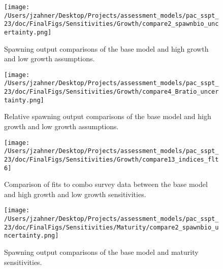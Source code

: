 \documentclass[11pt,
  letterpaper,
]{article}
\begin{document}
\begin{figure}
{\centering
\texttt{[image: /Users/jzahner/Desktop/Projects/assessment\_models/pac\_sspt\_23/doc/FinalFigs/Sensitivities/Growth/compare2\_spawnbio\_uncertainty.png]}
}
\caption{Spawning output comparisons of the base model and high growth and low growth assumptions.\label{fig:growth_sensitiv_spawning}}
\end{figure}

\begin{figure}
{\centering
\texttt{[image: /Users/jzahner/Desktop/Projects/assessment\_models/pac\_sspt\_23/doc/FinalFigs/Sensitivities/Growth/compare4\_Bratio\_uncertainty.png]}
}
\caption{Relative spawning output comparisons of the base model and high growth and low growth assumptions.\label{fig:growth_sensitiv_mngmt}}
\end{figure}

\begin{figure}
{\centering
\texttt{[image: /Users/jzahner/Desktop/Projects/assessment\_models/pac\_sspt\_23/doc/FinalFigs/Sensitivities/Growth/compare13\_indices\_flt6]}
}
\caption{Comparison of fits to combo survey data between the base model and high growth and low growth sensitivities.\label{fig:growth_sensitiv_indx}}
\end{figure}

\begin{figure}
{\centering
\texttt{[image: /Users/jzahner/Desktop/Projects/assessment\_models/pac\_sspt\_23/doc/FinalFigs/Sensitivities/Maturity/compare2\_spawnbio\_uncertainty.png]}
}
\caption{Spawning output comparisons of the base model and maturity sensitivities.\label{fig:mat_sensitiv_spawning}}
\end{figure}
\end{document}
